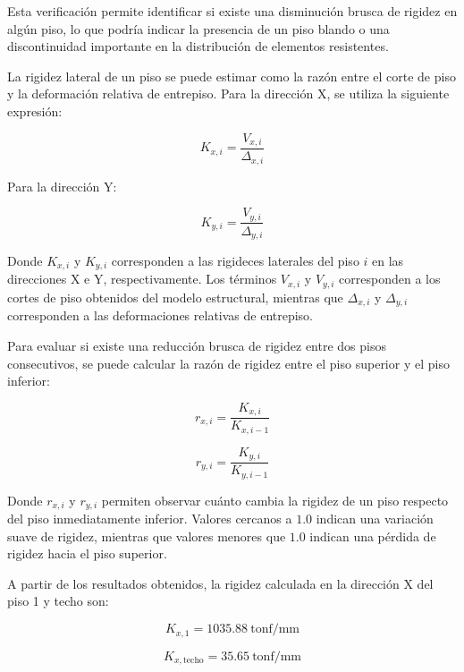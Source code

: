 Esta verificación permite identificar si existe una disminución brusca de rigidez en algún piso, lo que podría indicar la presencia de un piso blando o una discontinuidad importante en la distribución de elementos resistentes.

La rigidez lateral de un piso se puede estimar como la razón entre el corte de piso y la deformación relativa de entrepiso. Para la dirección X, se utiliza la siguiente expresión:

\begin{equation}
K_{x,i} = \frac{V_{x,i}}{\Delta_{x,i}}
\end{equation}

Para la dirección Y:

\begin{equation}
K_{y,i} = \frac{V_{y,i}}{\Delta_{y,i}}
\end{equation}

Donde $K_{x,i}$ y $K_{y,i}$ corresponden a las rigideces laterales del piso $i$ en las direcciones X e Y, respectivamente. Los términos $V_{x,i}$ y $V_{y,i}$ corresponden a los cortes de piso obtenidos del modelo estructural, mientras que $\Delta_{x,i}$ y $\Delta_{y,i}$ corresponden a las deformaciones relativas de entrepiso.

Para evaluar si existe una reducción brusca de rigidez entre dos pisos consecutivos, se puede calcular la razón de rigidez entre el piso superior y el piso inferior:

\begin{equation}
r_{x,i} = \frac{K_{x,i}}{K_{x,i-1}}
\end{equation}

\begin{equation}
r_{y,i} = \frac{K_{y,i}}{K_{y,i-1}}
\end{equation}

Donde $r_{x,i}$ y $r_{y,i}$ permiten observar cuánto cambia la rigidez de un piso respecto del piso inmediatamente inferior. Valores cercanos a $1.0$ indican una variación suave de rigidez, mientras que valores menores que $1.0$ indican una pérdida de rigidez hacia el piso superior.

A partir de los resultados obtenidos, la rigidez calculada en la dirección X del piso 1 y techo son:

\begin{equation}
K_{x,1} = 1035.88 \ \text{tonf/mm}
\end{equation}

\begin{equation}
K_{x,\text{techo}} = 35.65 \ \text{tonf/mm}
\end{equation}

